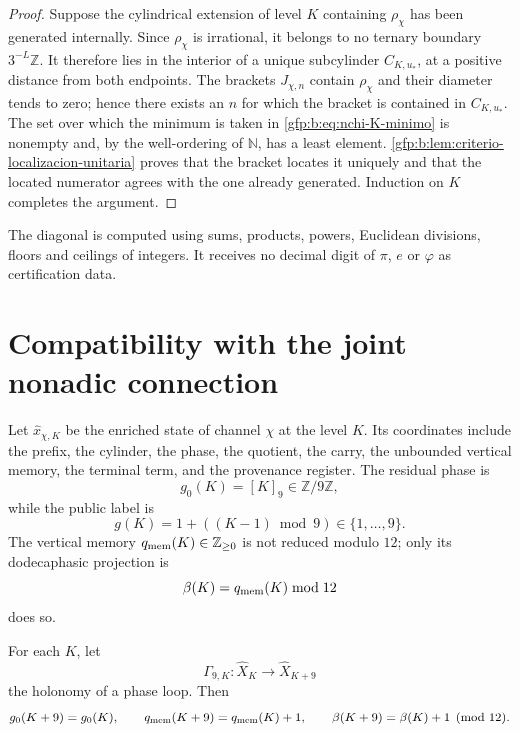 \begin{proof}
Suppose the cylindrical extension of level \(K\) containing
\(\rho_\chi\) has been generated internally. Since \(\rho_\chi\) is irrational, it belongs to no
ternary boundary \(3^{-L}\mathbb Z\). It therefore lies in the interior of a
unique subcylinder \(C_{K,u_*}\), at a positive distance from both endpoints.
The brackets \(J_{\chi,n}\) contain \(\rho_\chi\) and their diameter
tends to zero; hence there exists an \(n\) for which the bracket is
contained in \(C_{K,u_*}\). The set over which the minimum is taken in
\eqref{gfp:b:eq:nchi-K-minimo} is nonempty and, by the well-ordering of
\(\mathbb N\), has a least element.
\cref{gfp:b:lem:criterio-localizacion-unitaria} proves that the bracket
locates it uniquely and that the located numerator agrees with the one already
generated. Induction on \(K\) completes the argument.
\end{proof}

\begin{corollary}
The diagonal is computed using sums, products, powers, Euclidean divisions,
floors and ceilings of integers. It receives no decimal digit of \(\pi\), \(e\) or
\(\varphi\) as certification data.
\end{corollary}

\section{Compatibility with the joint nonadic connection}

Let \(\widehat x_{\chi,K}\) be the enriched state of channel \(\chi\) at
the level \(K\). Its coordinates include the prefix, the cylinder, the phase,
the quotient, the carry, the unbounded vertical memory, the terminal term,
and the provenance register. The residual phase is
\[
 g_0(K)=[K]_9\in\mathbb Z/9\mathbb Z,
\]
while the public label is
\[
 g(K)=1+((K-1)\bmod9)\in\{1,\ldots,9\}.
\]
The vertical memory \(q_{\rm mem}(K)\in\mathbb Z_{\geq0}\) is not reduced
modulo \(12\); only its dodecaphasic projection is
\[
 \beta(K)=q_{\rm mem}(K)\bmod12
\]
does so.

For each \(K\), let
\[
 \Gamma_{9,K}:\widehat X_K\longrightarrow\widehat X_{K+9}
\]
the holonomy of a phase loop. Then
\[
 g_0(K+9)=g_0(K),
 \qquad
 q_{\rm mem}(K+9)=q_{\rm mem}(K)+1,
 \qquad
 \beta(K+9)=\beta(K)+1\pmod{12}.
\]

